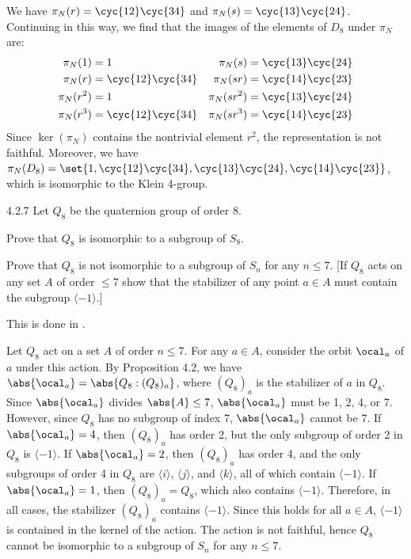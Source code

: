 \begin{sol}
	We have $\pi_N(r) = \cyc{1 2}\cyc{3 4}$ and $\pi_N(s) = \cyc{1 3}\cyc{2 4}$.
	Continuing in this way, we find that the images of the elements of $D_8$ under $\pi_N$ are:
	\begin{align*}
		\pi_N(1) & = 1 & \pi_N(s) & = \cyc{1 3}\cyc{2 4} \\
		\pi_N(r) & = \cyc{1 2}\cyc{3 4} & \pi_N(sr) & = \cyc{1 4}\cyc{2 3} \\
		\pi_N(r^2) & = 1 & \pi_N(sr^2) & = \cyc{1 3}\cyc{2 4} \\
		\pi_N(r^3) & = \cyc{1 2}\cyc{3 4} & \pi_N(sr^3) & = \cyc{1 4}\cyc{2 3}
	\end{align*}
	Since $\ker(\pi_N)$ contains the nontrivial element $r^2$, the representation is not faithful.
	Moreover, we have $\pi_N(D_8) = \set{1, \cyc{1 2}\cyc{3 4}, \cyc{1 3}\cyc{2 4}, \cyc{1 4}\cyc{2 3}}$, which is isomorphic to the Klein 4-group.
\end{sol}

\begin{exercise}{4.2.7}
	Let $Q_8$ be the quaternion group of order 8.
	\begin{subexercises}
		\item Prove that $Q_8$ is isomorphic to a subgroup of $S_8$.
		\item Prove that $Q_8$ is not isomorphic to a subgroup of $S_n$ for any $n \leq 7$. [If $Q_8$ acts on any set $A$ of order $\leq 7$ show that the stabilizer of any point $a \in A$ must contain the subgroup $\langle -1 \rangle$.]
	\end{subexercises}
\end{exercise}

\begin{solenum}
	\item This is done in .
	\item Let $Q_8$ act on a set $A$ of order $n \leq 7$.
	For any $a \in A$, consider the orbit $\ocal_a$ of $a$ under this action.
	By Proposition 4.2, we have $\abs{\ocal_a} = \abs{Q_8 : (Q_8)_a}$, where $(Q_8)_a$ is the stabilizer of $a$ in $Q_8$.
	Since $\abs{\ocal_a}$ divides $\abs{A} \leq 7$, $\abs{\ocal_a}$ must be 1, 2, 4, or 7.
	However, since $Q_8$ has no subgroup of index 7, $\abs{\ocal_a}$ cannot be 7.
	If $\abs{\ocal_a} = 4$, then $(Q_8)_a$ has order 2, but the only subgroup of order 2 in $Q_8$ is $\langle -1 \rangle$.
	If $\abs{\ocal_a} = 2$, then $(Q_8)_a$ has order 4, and the only subgroups of order 4 in $Q_8$ are $\langle i \rangle$, $\langle j \rangle$, and $\langle k \rangle$, all of which contain $\langle -1 \rangle$.
	If $\abs{\ocal_a} = 1$, then $(Q_8)_a = Q_8$, which also contains $\langle -1 \rangle$.
	Therefore, in all cases, the stabilizer $(Q_8)_a$ contains $\langle -1 \rangle$.
	Since this holds for all $a \in A$, $\langle -1 \rangle$ is contained in the kernel of the action.
	The action is not faithful, hence $Q_8$ cannot be isomorphic to a subgroup of $S_n$ for any $n \leq 7$.
\end{solenum}

